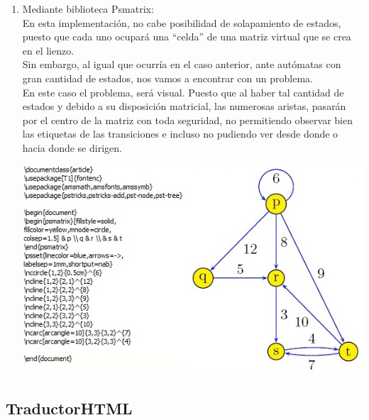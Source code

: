 \documentclass[12pt,a4paper,spanish]{book}
\begin{document}
\begin{itemize}
\begin{enumerate}
\item Mediante biblioteca Psmatrix:\\
\newline
En esta implementaci\'on, no cabe posibilidad de solapamiento de estados, puesto que cada uno ocupar\'a una ``celda'' de una matriz virtual que se crea en el lienzo.\\
Sin embargo, al igual que ocurr\'ia en el caso anterior, ante aut\'omatas con gran cantidad de estados, nos vamos a encontrar con un problema.\\
\newline
En este caso el problema, ser\'a visual. Puesto que al haber tal cantidad de estados y debido a su disposici\'on matricial, las numerosas aristas, pasar\'an por el centro de la matriz con toda seguridad, no permitiendo observar bien las etiquetas de las transiciones e incluso no pudiendo ver desde donde o hacia donde se dirigen.
\begin{center}
\includegraphics{late.jpg}
\end{center}
\end{enumerate}
\end{itemize}
\newpage

\subsection{TraductorHTML}
\end{document}
